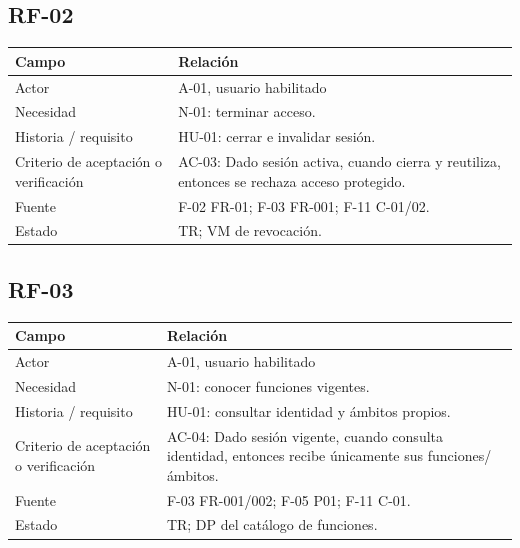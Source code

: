 \documentclass[12pt,a4paper]{report}
\begin{document}
\subsection{RF-02}\label{matriz-RF-02}

{\def\LTcaptype{none} %
\begin{longtable}[]{@{}
  >{\raggedright\arraybackslash}p{}
  >{\raggedright\arraybackslash}p{}@{}}
\toprule\noalign{}
\begin{minipage}[b]{\linewidth}\raggedright
Campo
\end{minipage} & \begin{minipage}[b]{\linewidth}\raggedright
Relación
\end{minipage} \\
\midrule\noalign{}
\endhead
\bottomrule\noalign{}
\endlastfoot
Actor & A-01, usuario habilitado \\
Necesidad & N-01: terminar acceso. \\
Historia / requisito & HU-01: cerrar e invalidar sesión. \\
Criterio de aceptación o verificación & AC-03: Dado sesión activa,
cuando cierra y reutiliza, entonces se rechaza acceso protegido. \\
Fuente & F-02 FR-01; F-03 FR-001; F-11 C-01/02. \\
Estado & TR; VM de revocación. \\
\end{longtable}
}

\subsection{RF-03}\label{matriz-RF-03}

{\def\LTcaptype{none} %
\begin{longtable}[]{@{}
  >{\raggedright\arraybackslash}p{}
  >{\raggedright\arraybackslash}p{}@{}}
\toprule\noalign{}
\begin{minipage}[b]{\linewidth}\raggedright
Campo
\end{minipage} & \begin{minipage}[b]{\linewidth}\raggedright
Relación
\end{minipage} \\
\midrule\noalign{}
\endhead
\bottomrule\noalign{}
\endlastfoot
Actor & A-01, usuario habilitado \\
Necesidad & N-01: conocer funciones vigentes. \\
Historia / requisito & HU-01: consultar identidad y ámbitos
propios. \\
Criterio de aceptación o verificación & AC-04: Dado sesión vigente,
cuando consulta identidad, entonces recibe únicamente sus
funciones/ámbitos. \\
Fuente & F-03 FR-001/002; F-05 P01; F-11 C-01. \\
Estado & TR; DP del catálogo de funciones. \\
\end{longtable}
}
\end{document}
